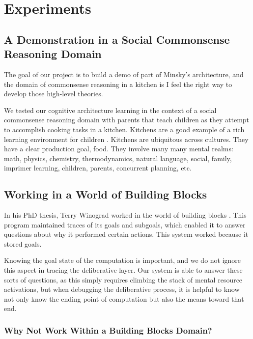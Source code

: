 \chapter{Experiments}\label{ch:experiments}

\section{A Demonstration in a Social Commonsense Reasoning Domain}

The goal of our project is to build a demo of part of Minsky's
architecture, and the domain of commonsense reasoning in a kitchen is
I feel the right way to develop those high-level theories.

We tested our cognitive architecture learning in the context of a
social commonsense reasoning domain with parents that teach children
as they attempt to accomplish cooking tasks in a kitchen.  Kitchens
are a good example of a rich learning environment for children
\citep{dewey:1907}.  Kitchens are ubiquitous across cultures.  They
have a clear production goal, food.  They involve many many mental
realms: math, physics, chemistry, thermodynamics, natural language,
social, family, imprimer learning, children, parents, concurrent
planning, etc.

\section{Working in a World of Building Blocks}

In his PhD thesis, Terry Winograd worked in the world of building
blocks \citep{winograd:1970}.  This program maintained traces of its
goals and subgoals, which enabled it to answer questions about why it
performed certain actions.  This system worked because it stored
goals.

Knowing the goal state of the computation is important, and we do not
ignore this aspect in tracing the deliberative layer.  Our system is
able to answer these sorts of questions, as this simply requires
climbing the stack of mental resource activations, but when debugging
the deliberative process, it is helpful to know not only know the
ending point of computation but also the means toward that end.

\subsection{Why Not Work Within a Building Blocks Domain?}

